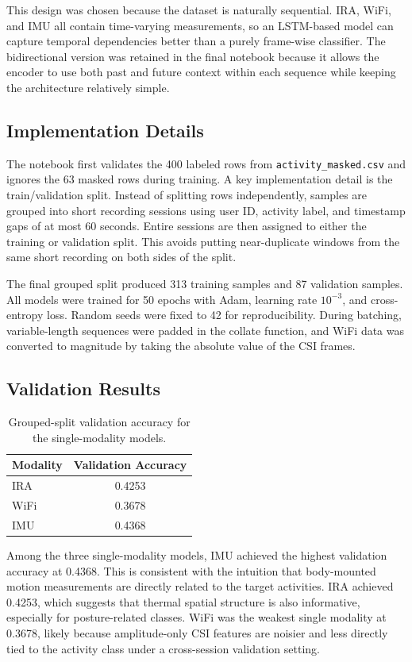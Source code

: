 This design was chosen because the dataset is naturally sequential. IRA, WiFi, and IMU all contain time-varying measurements, so an LSTM-based model can capture temporal dependencies better than a purely frame-wise classifier. The bidirectional version was retained in the final notebook because it allows the encoder to use both past and future context within each sequence while keeping the architecture relatively simple.

\subsection{Implementation Details}
The notebook first validates the 400 labeled rows from \texttt{activity\_masked.csv} and ignores the 63 masked rows during training. A key implementation detail is the train/validation split. Instead of splitting rows independently, samples are grouped into short recording sessions using user ID, activity label, and timestamp gaps of at most 60 seconds. Entire sessions are then assigned to either the training or validation split. This avoids putting near-duplicate windows from the same short recording on both sides of the split.

The final grouped split produced 313 training samples and 87 validation samples. All models were trained for 50 epochs with Adam, learning rate \(10^{-3}\), and cross-entropy loss. Random seeds were fixed to 42 for reproducibility. During batching, variable-length sequences were padded in the collate function, and WiFi data was converted to magnitude by taking the absolute value of the CSI frames.

\subsection{Validation Results}
\begin{table}[H]
\centering
\small
\begin{tabular}{lc}
\toprule
\textbf{Modality} & \textbf{Validation Accuracy} \\
\midrule
IRA & 0.4253 \\
WiFi & 0.3678 \\
IMU & 0.4368 \\
\bottomrule
\end{tabular}
\caption{Grouped-split validation accuracy for the single-modality models.}
\label{tab:single-results}
\end{table}

Among the three single-modality models, IMU achieved the highest validation accuracy at 0.4368. This is consistent with the intuition that body-mounted motion measurements are directly related to the target activities. IRA achieved 0.4253, which suggests that thermal spatial structure is also informative, especially for posture-related classes. WiFi was the weakest single modality at 0.3678, likely because amplitude-only CSI features are noisier and less directly tied to the activity class under a cross-session validation setting.

